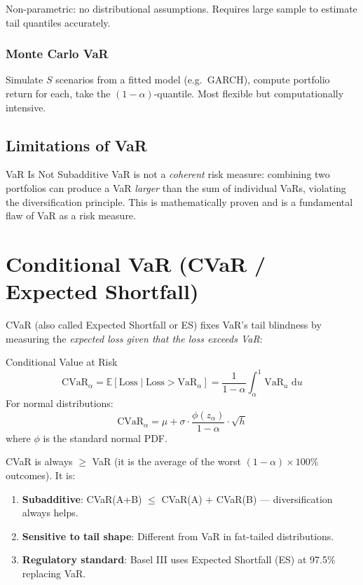 \documentclass[12pt,a4paper,openany]{report}
\theoremstyle{definition}
\newcommand{\E}{\mathbb{E}}
\newcommand{\dd}{\,\mathrm{d}}
\begin{document}
Non-parametric: no distributional assumptions. Requires large sample to estimate tail quantiles accurately.

\subsubsection{Monte Carlo VaR}

Simulate $S$ scenarios from a fitted model (e.g.\ GARCH), compute portfolio return for each, take the $(1-\alpha)$-quantile. Most flexible but computationally intensive.

\subsection{Limitations of VaR}

\begin{warningbox}{VaR Is Not Subadditive}
VaR is not a \emph{coherent} risk measure: combining two portfolios can produce a VaR \emph{larger} than the sum of individual VaRs, violating the diversification principle. This is mathematically proven and is a fundamental flaw of VaR as a risk measure.
\end{warningbox}

\section{Conditional VaR (CVaR / Expected Shortfall)}

CVaR (also called Expected Shortfall or ES) fixes VaR's tail blindness by measuring the \emph{expected loss given that the loss exceeds VaR}:

\begin{definitionbox}{Conditional Value at Risk}
\[
  \text{CVaR}_\alpha = \E[\text{Loss} \mid \text{Loss} > \text{VaR}_\alpha] = \frac{1}{1-\alpha}\int_\alpha^1 \text{VaR}_u \,\dd u
\]
For normal distributions:
\[
  \text{CVaR}_\alpha = \mu + \sigma \cdot \frac{\phi(z_\alpha)}{1-\alpha} \cdot \sqrt{h}
\]
where $\phi$ is the standard normal PDF.
\end{definitionbox}

CVaR is always $\geq$ VaR (it is the average of the worst $(1-\alpha)\times100\%$ outcomes). It is:
\begin{enumerate}[label=\arabic*.]
  \item \textbf{Subadditive}: CVaR(A+B) $\leq$ CVaR(A) + CVaR(B) — diversification always helps.
  \item \textbf{Sensitive to tail shape}: Different from VaR in fat-tailed distributions.
  \item \textbf{Regulatory standard}: Basel III uses Expected Shortfall (ES) at 97.5\% replacing VaR.
\end{enumerate}
\end{document}
